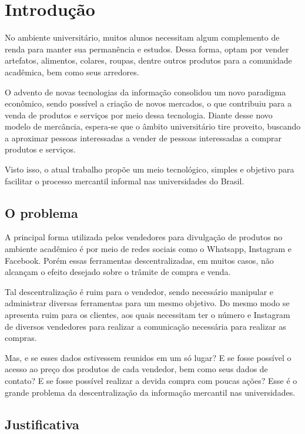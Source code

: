 \chapter{Introdução}


No ambiente universitário, muitos alunos necessitam algum complemento de renda para manter sua permanência e estudos. Dessa forma, optam por vender artefatos, alimentos, colares, roupas, dentre outros produtos para a comunidade acadêmica, bem como seus arredores.

O advento de novas tecnologias da informação consolidou um novo paradigma econômico, sendo possível a criação de novos mercados, o que contribuiu para a venda de produtos e serviços por meio dessa tecnologia. Diante desse novo modelo de mercância, espera-se que o âmbito universitário tire proveito, buscando a aproximar pessoas interessadas a vender de pessoas interessadas a comprar produtos e serviços.

Visto isso, o atual trabalho propõe um meio tecnológico, simples e objetivo para facilitar o processo mercantil informal nas universidades do Brasil.

\section{O problema}

A principal forma utilizada pelos vendedores para divulgação de produtos no ambiente acadêmico é por meio de redes sociais como o Whatsapp, Instagram e Facebook. Porém essas ferramentas descentralizadas, em muitos casos, não alcançam o efeito desejado sobre  o trâmite de compra e venda.

Tal descentralização é ruim para o vendedor, sendo necessário manipular e administrar diversas ferramentas para um mesmo objetivo. Do mesmo modo se apresenta ruim para os clientes, aos quais necessitam ter o número e Instagram de diversos vendedores para realizar a comunicação necessária para realizar as compras. 

Mas, e se esses dados estivessem reunidos em um só lugar? E se fosse possível o acesso ao preço dos produtos de cada vendedor, bem como seus dados de contato? E se fosse possível realizar a devida compra com poucas ações? Esse é o grande problema da descentralização da informação mercantil nas universidades.

\section{Justificativa}
\label{sec:justificativa}

